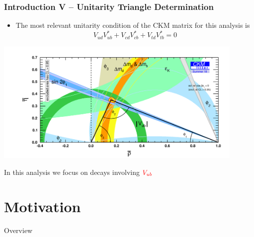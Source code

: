 \documentclass[serif]{beamer}
\begin{document}
\begin{frame}[t]
\frametitle{Introduction V -- Unitarity Triangle Determination}
\small
\vspace{-3mm}
\begin{block}{}
	\begin{itemize}
		\item The most relevant unitarity condition of the CKM matrix for this analysis is
		$$V_{ud}V_{ub}^{*}+V_{cd}V_{cb}^{*}+V_{td}V_{tb}^{*} = 0$$
	\end{itemize}
\end{block}
\vspace{-2mm}

\begin{center}
		\includegraphics[width=0.9\textwidth]{fig/belle_rhoeta_small_global}
\end{center}

\vspace{-2mm}

In this analysis we focus on decays involving $\textcolor{red}{V_{ub}}$

\end{frame}

\section{Motivation} 

\begin{frame}[t]{Overview}
\end{frame}

\end{document}
